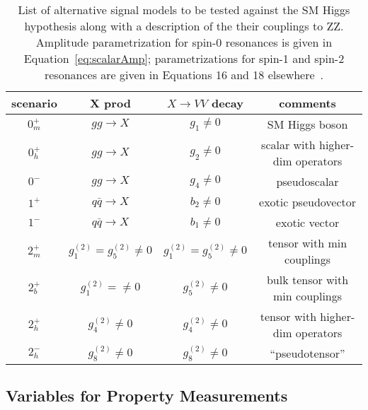 \begin{table}
\begin{center}
\begin{tabular}{cccc}
\hline 
\hline
scenario & X prod & $X\to VV$ decay & comments \\
\hline
$0_m^+$ & $gg\to X$ & $g_1\neq 0$ & SM Higgs boson \\ 
$0_h^+$ & $gg\to X$ & $g_2\neq 0$ & scalar with higher-dim operators \\ 
$0^-$ & $gg\to X$ & $g_4\neq 0$ & pseudoscalar \\ 
$1^+$ & $q\bar{q}\to X$ & $b_2\neq 0$ & exotic pseudovector\\
$1^-$ & $q\bar{q}\to X$ & $b_1\neq 0$ & exotic vector \\ 
$2_m^+$ & $g_1^{(2)}=g_5^{(2)}\neq 0$ & $g_1^{(2)}=g_5^{(2)}\neq 0$ & tensor with min couplings\\
$2_b^+$ & $g_1^{(2)}=\neq 0$ & $g_5^{(2)}\neq 0$ & bulk tensor with min couplings \\
$2_h^+$ & $g_4^{(2)}\neq 0$ & $g_4^{(2)}\neq 0$ & tensor with higher-dim operators\\
$2_h^-$ & $g_8^{(2)}\neq 0$ & $g_8^{(2)}\neq 0$ & ``pseudotensor''\\ 
\hline
\hline
\end{tabular}
\end{center}
\caption{List of alternative signal models to be tested against the SM Higgs 
hypothesis along with a description of the their couplings to ZZ.  Amplitude
parametrization for spin-0 resonances is given in Equation~\ref{eq:scalarAmp};
parametrizations for spin-1 and spin-2 resonances are given in Equations 16 and 18 elsewhere~\cite{Bolognesi:2012mm}.}
\label{table:alternativeModels}
\end{table}

\subsection{Variables for Property Measurements}
\label{sec:Spin-parity}

